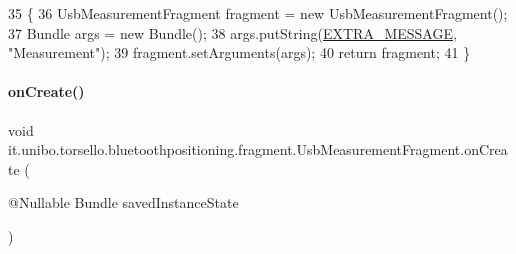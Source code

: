 \begin{DoxyCode}
35                                                        \{
36         UsbMeasurementFragment fragment = \textcolor{keyword}{new} UsbMeasurementFragment();
37         Bundle args = \textcolor{keyword}{new} Bundle();
38         args.putString(\hyperlink{classit_1_1unibo_1_1torsello_1_1bluetoothpositioning_1_1fragment_1_1UsbMeasurementFragment_a3f7dc91fec5b29690b904a980e5901ab_a3f7dc91fec5b29690b904a980e5901ab}{EXTRA\_MESSAGE}, \textcolor{stringliteral}{"Measurement"});
39         fragment.setArguments(args);
40         \textcolor{keywordflow}{return} fragment;
41     \}
\end{DoxyCode}
\hypertarget{classit_1_1unibo_1_1torsello_1_1bluetoothpositioning_1_1fragment_1_1UsbMeasurementFragment_aaa41498cdcda2a717cdc945e6923f2b1_aaa41498cdcda2a717cdc945e6923f2b1}{}\label{classit_1_1unibo_1_1torsello_1_1bluetoothpositioning_1_1fragment_1_1UsbMeasurementFragment_aaa41498cdcda2a717cdc945e6923f2b1_aaa41498cdcda2a717cdc945e6923f2b1} 
\paragraph{\texorpdfstring{on\+Create()}{onCreate()}}
{\footnotesize\ttfamily void it.\+unibo.\+torsello.\+bluetoothpositioning.\+fragment.\+Usb\+Measurement\+Fragment.\+on\+Create (\begin{DoxyParamCaption}\item[{@Nullable Bundle}]{saved\+Instance\+State }\end{DoxyParamCaption})}



